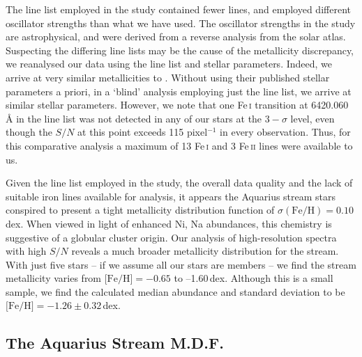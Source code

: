 \documentclass{emulateapj}
\begin{document}
The line list employed in the \citet{wylie-de-boer;et-al_2012} study contained fewer lines, and employed different oscillator strengths than what we have used. The oscillator strengths in the \citet{wylie-de-boer;et-al_2012} study are astrophysical, and were derived from a reverse analysis from the \citet{hinkle;et-al_2003} solar atlas. Suspecting the differing line lists may be the cause of the  metallicity discrepancy, we reanalysed our data using the \citet{wylie-de-boer;et-al_2012} line list and stellar parameters. Indeed, we arrive at very similar metallicities to \citet{wylie-de-boer;et-al_2012}. Without using their published stellar parameters a priori, in a `blind' analysis employing just the \citet{wylie-de-boer;et-al_2012} line list, we arrive at similar stellar parameters. However, we note that one Fe\,\textsc{i} transition at 6420.060\,\AA{} in the \citet{wylie-de-boer;et-al_2012} line list was not detected in any of our stars at the $3-\sigma$ level, even though the $S/N$ at this point exceeds 115 pixel$^{-1}$ in every observation. Thus, for this comparative analysis a maximum of 13 Fe\,\textsc{i} and 3 Fe\,\textsc{ii} lines were available to us.

Given the line list employed in the \citet{wylie-de-boer;et-al_2012} study, the overall data quality and the lack of suitable iron lines available for analysis, it appears the Aquarius stream stars conspired to present a tight metallicity distribution function of $\sigma(\mbox{Fe/H}) = 0.10$\,dex. When viewed in light of enhanced Ni, Na abundances, this chemistry is suggestive of a globular cluster origin. Our analysis of high-resolution spectra with high $S/N$ reveals a much broader metallicity distribution for the stream. With just five stars -- if we assume all our stars are members -- we find the stream metallicity varies from $\mbox{[Fe/H]} = -0.65$ to --1.60\,dex. Although this is a small sample, we find the calculated median abundance and standard deviation to be $\mbox{[Fe/H]} = -1.26 \pm 0.32$\,dex.


\subsection{The Aquarius Stream M.D.F.}



\end{document}
